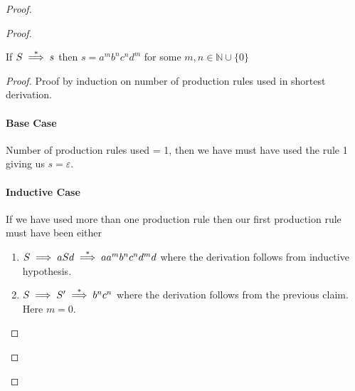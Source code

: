\begin{soln}
\begin{proof}
\begin{proof}
\begin{claim}
If $S \stackrel{*}{\implies} s$ then $s = a^m b^n c^n d^m$ for some $m, n \in \mathbb{N} \cup \{0\}$
\end{claim}
\begin{proof}
Proof by induction on number of production rules used in shortest derivation.
\paragraph{Base Case} Number of production rules used = 1, then we have must have used the rule 1 giving us $s = \varepsilon$.
\paragraph{Inductive Case} If we have used more than one production rule then our first production rule must have been either
\begin{enumerate}
    \item  $S \implies a S d \stackrel{*}{\implies} a a^m b^n c^n d^m d$ where the derivation follows from inductive hypothesis.
    \item $S \implies S' \stackrel{*}{\implies} b^n c^n$ where the derivation follows from the previous claim. Here $m = 0$.
\end{enumerate}
\end{proof}
\end{proof}

\end{proof}
\end{soln}